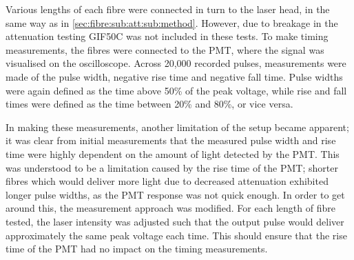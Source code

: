 \documentclass[a4paper,11pt]{article}
\begin{document}
Various lengths of each fibre were connected in turn to the laser head, in the same way as in \cref{sec:fibre:sub:att:sub:method}. However, due to breakage in the attenuation testing GIF50C was not included in these tests. To make timing measurements, the fibres were connected to the PMT, where the signal was visualised on the oscilloscope. Across 20,000 recorded pulses, measurements were made of the pulse width, negative rise time and negative fall time. Pulse widths were again defined as the time above 50\% of the peak voltage, while rise and fall times were defined as the time between 20\% and 80\%, or vice versa.

In making these measurements, another limitation of the setup became apparent; it was clear from initial measurements that the measured pulse width and rise time were highly dependent on the amount of light detected by the PMT. This was understood to be a limitation caused by the rise time of the PMT; shorter fibres which would deliver more light due to decreased attenuation exhibited longer pulse widths, as the PMT response was not quick enough. In order to get around this, the measurement approach was modified. For each length of fibre tested, the laser intensity was adjusted such that the output pulse would deliver approximately the same peak voltage each time. This should ensure that the rise time of the PMT had no impact on the timing measurements.
\end{document}
